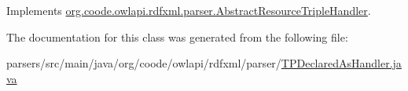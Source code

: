 Implements \hyperlink{classorg_1_1coode_1_1owlapi_1_1rdfxml_1_1parser_1_1_abstract_resource_triple_handler_acfa19ca318d5aaf7fc66e361ba02e7e8}{org.\-coode.\-owlapi.\-rdfxml.\-parser.\-Abstract\-Resource\-Triple\-Handler}.



The documentation for this class was generated from the following file\-:\begin{DoxyCompactItemize}
\item 
parsers/src/main/java/org/coode/owlapi/rdfxml/parser/\hyperlink{_t_p_declared_as_handler_8java}{T\-P\-Declared\-As\-Handler.\-java}\end{DoxyCompactItemize}
